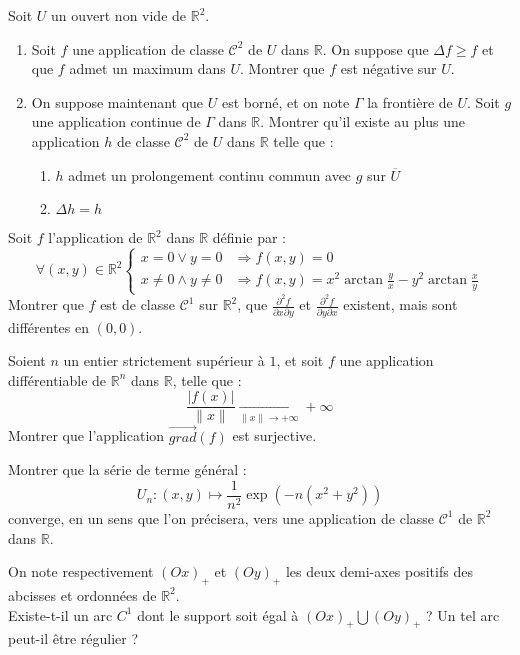 \begin{exer}
Soit $U$ un ouvert non vide de $\mathbb{R}^2$.
\begin{enumerate}
\item Soit $f$ une application de classe $\mathcal{C}^2$ de $U$ dans $\mathbb{R}$. %
On suppose que $\Delta f\geq f$ et que $f$ admet un maximum dans $U$. %
Montrer que $f$ est n\'egative sur $U$.
\item On suppose maintenant que $U$ est born\'e, et on note $\Gamma$ la fronti\`ere de $U$. %
Soit $g$ une application continue de $\Gamma$ dans $\mathbb{R}$. %
Montrer qu'il existe au plus une application $h$ de classe $\mathcal{C}^2$ de $U$ dans $\mathbb{R}$ telle que :
\begin{enumerate}
\item $h$ admet un prolongement continu commun avec $g$ sur $\overline{U}$
\item $\Delta h=h$
\end{enumerate}
\end{enumerate}
\end{exer}

\begin{exer}
Soit $f$ l'application de $\mathbb{R}^2$ dans $\mathbb{R}$ d\'efinie par :
\begin{equation}\forall (x,y)\in\mathbb{R}^2
\left\{
\begin{aligned}x=0\vee y=0 &\Rightarrow f(x,y)=0\\
x\neq 0\wedge y\neq 0 &\Rightarrow f(x,y)=x^2\arctan\frac{y}{x}-y^2\arctan\frac{x}{y}
\end{aligned}
\right.
\end{equation}
Montrer que $f$ est de classe $\mathcal{C}^1$ sur $\mathbb{R}^2$, %
que $\frac{\partial^2{f}}{\partial{x}\partial{y}}$ et $\frac{\partial^2{f}}{\partial{y}\partial{x}}$ existent, mais sont diff\'erentes en $(0,0)$.
\end{exer}

\begin{exer}
Soient $n$ un entier strictement sup\'erieur \`a $1$, et soit $f$ une application diff\'erentiable de $\mathbb{R}^n$ dans $\mathbb{R}$, telle que :
\[\frac{|f(x)|}{\| x\|}\underset{\| x\|\rightarrow +\infty}{\longrightarrow}+\infty\]
Montrer que l'application $\overrightarrow{grad}(f)$ est surjective.
\end{exer}

\begin{exer}
Montrer que la s\'erie de terme g\'en\'eral :
\[U_n:(x,y)\mapsto \frac{1}{n^2}\exp(-n(x^2+y^2))\]
converge, en un sens que l'on pr\'ecisera, vers une application de classe $\mathcal{C}^1$ de $\mathbb{R}^2$ dans $\mathbb{R}$.
\end{exer}

\begin{exer}
On note respectivement $(Ox)_+$ et $(Oy)_+$ les deux demi-axes positifs des abcisses et ordonnées de $\mathbb{R}^2$.\\
Existe-t-il un arc $C^1$ dont le support soit égal à $(Ox)_+ \bigcup (Oy)_+$ ? Un tel arc peut-il être régulier ?
\end{exer}